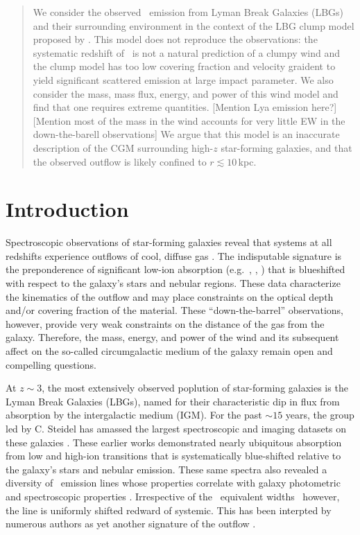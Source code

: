\documentclass[12pt,preprint]{aastex}
\begin{document}
\begin{abstract}
We consider the observed \lya\ emission from Lyman Break Galaxies
(LBGs) and their surrounding environment in the context of the LBG
clump model proposed by \cite{steidel10}.  This model does not
reproduce the observations: the systematic redshift of \lya\ is not a
natural prediction of a clumpy wind and the clump model has too low
covering fraction and velocity graident to yield significant scattered
emission at large impact parameter.  We also consider the mass, mass
flux, energy, and power of this wind model and find that one requires
extreme quantities.  [Mention Lya emission here?]
[Mention most of the mass in the wind accounts for very little EW in
the down-the-barell observations]
We argue that this model is an inaccurate description of the CGM
surrounding high-$z$ star-forming galaxies, and that the observed
outflow is likely confined to $r \lesssim 10$\,kpc.
\end{abstract}


\section{Introduction}

Spectroscopic observations of star-forming galaxies reveal that 
systems at all redshifts experience outflows of cool, diffuse gas
\citep[e.g.][]{rupke,weiner,shapley03,rubin}.  The indisputable
signature is the preponderence of significant low-ion absorption
(e.g.\ , , ) that is
blueshifted with respect to the galaxy's stars and nebular regions.
These data characterize the kinematics of the outflow and may place
constraints on the optical depth and/or covering fraction of the
material.  These ``down-the-barrel'' observations, however, provide
very weak constraints on the distance of the gas from the galaxy.
Therefore, the mass, energy, and power of the wind and its subsequent
affect on the so-called circumgalactic medium of the galaxy remain
open and compelling questions.

At $z\sim 3$, the most extensively observed poplution of star-forming
galaxies is the Lyman Break Galaxies (LBGs), named for their
characteristic dip in flux from absorption by the intergalactic medium
(IGM).  For the past $\sim 15$ years, the group led by C. Steidel has
amassed the largest spectroscopic and imaging datasets on these
galaxies \citep{steidel96,shapley03,reddyXX}.  These earlier works
demonstrated nearly ubiquitous absorption from low and high-ion
transitions that is systematically blue-shifted relative to the
galaxy's stars and nebular emission.  These same spectra also revealed
a diversity of \lya\ emission lines whose properties correlate with galaxy photometric
and spectroscopic properties \citep{shapley08,cooke08}.  Irrespective
of the \lya\ equivalent widths \wlya\, however, the line is uniformly
shifted redward of systemic.  This has been interpted by numerous
authors as yet another signature of the outflow
\citep[e.g.][]{pettini,verhamme}. 
\end{document}
